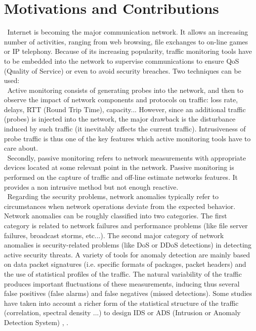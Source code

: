 \documentclass[a4paper, 10pt, onecolumn]{article}
\begin{document}
\section{Motivations and Contributions}
~\indent Internet is becoming the major communication network. It allows an increasing number of activities, ranging from web browsing, file exchanges to on-line games or IP telephony. Because of its increasing popularity, traffic monitoring tools have to be embedded into the network to supervise communications to ensure QoS (Quality of Service) or even to avoid security breaches. Two techniques can be used:\\
~\indent Active monitoring \cite{Pra03} consists of generating probes into the network, and then to observe the impact of network components and protocols on traffic: loss rate, delays, RTT (Round Trip Time), capacity... However, since an additional traffic (probes) is injected into the network, the major drawback is the disturbance induced by such traffic (it inevitably affects the current traffic). Intrusiveness of probe traffic is thus one of the key features which active monitoring tools have to care about.\\
~\indent Secondly, passive monitoring  \cite{Cle00} refers to network measurements with appropriate devices located at some relevant point in the network. Passive monitoring is performed on the capture of traffic and off-line estimate networks features. It provides a non intrusive method but not enough reactive.   
\\~\indent Regarding the security problems, network anomalies typically refer to circumstances when network operations deviate from the expected behavior. Network anomalies can be roughly classified into two categories. The first category is related to network failures and performance problems (like file server failures, broadcast storms, etc...). The second major category of network anomalies is security-related problems (like DoS or DDoS detections) in detecting active security threats. A variety of tools for anomaly detection are mainly based on data packet signatures (i.e. specific formats of packages, packet headers) and the use of statistical profiles of the traffic. The natural variability of the traffic \cite{Park96} produces important fluctuations of these measurements, inducing thus several false positives (false alarms) and false negatives (missed detections). Some studies have taken into account a richer form of the statistical structure of the traffic (correlation, spectral density ...) to design IDS or ADS (Intrusion or Anomaly Detection System) \cite{Hus03}, \cite{lak04}.\\
\end{document}
